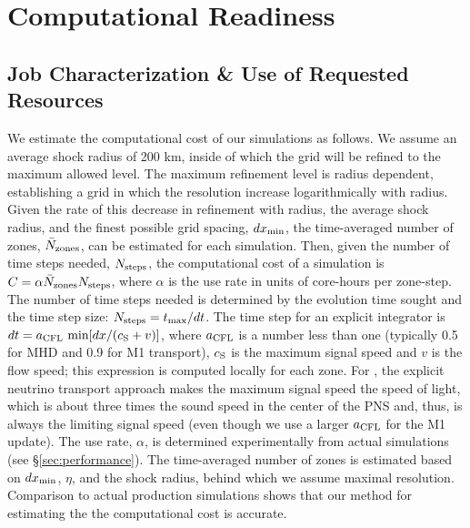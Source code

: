 \section{Computational Readiness}
\label{sec:readiness}

\subsection{Job Characterization \& Use of Requested Resources}
\label{sec:jobs}

We estimate the computational cost of our
simulations as follows.  We
assume an average shock radius of 200 km, inside of which the grid
will be refined to the maximum allowed level.
The maximum refinement level is radius dependent, establishing a grid in which the resolution increase logarithmically with radius.
Given the rate of this decrease in refinement with radius, the
average shock radius, and the finest possible grid spacing, $d
x_{\rm min}$, the time-averaged number of zones, $\bar N_{\rm zones}$,
can be estimated for each simulation.  Then, given the number of time
steps needed, $N_{\rm steps}$, the computational cost of a simulation
is $C = \alpha   \bar N_{\rm zones} N_{\rm steps}$,
where $\alpha$ is the use rate in units of core-hours per zone-step.
The number of time steps needed is determined by the
evolution time sought and the time step size: $N_{\rm steps} = t_{\rm
  max} / d t$.
The time step for an explicit integrator is $d t = a_{\rm CFL}\ {\rm min}[d x / (c_{\rm S} + v)]$, where $a_{\rm CFL}$ is a number less than one (typically 0.5 for MHD and 0.9 for M1 transport), $c_{\rm S}$ is the maximum signal speed and $v$ is the flow speed; this expression is computed locally for each zone.
For \sparkmone, the explicit neutrino transport approach makes the maximum signal speed the speed of light, which is about three times the sound speed in the center of the PNS and, thus, is always the limiting signal speed (even though we use a larger $a_{\rm CFL}$ for the M1 update).
The use rate, $\alpha$, is determined experimentally from actual simulations (see \S\ref{sec:performance}).  The time-averaged number of zones is estimated based on $d x_{\rm min}$, $\eta$, and the shock radius, behind which we assume maximal resolution.  Comparison to actual production simulations shows that our method for estimating the the computational cost is accurate.


